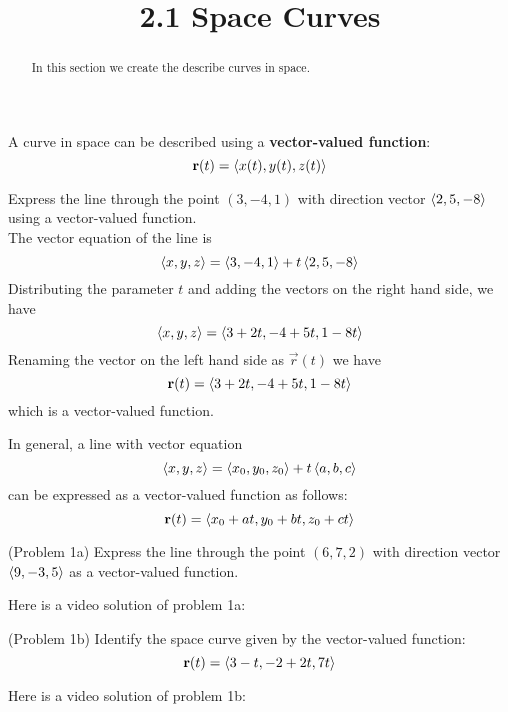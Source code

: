 \documentclass[handout]{ximera}
\title{2.1 Space Curves}
\begin{document}
\begin{abstract}
In this section we create the describe curves in space.
\end{abstract}

\maketitle


A curve in space can be described using a \textbf{vector-valued function}:
\[
\mathbf r(t) = \left\langle x(t), y(t), z(t)\right\rangle
\]

\begin{example}[Example 1]
Express the line through the point $(3, -4, 1)$ with direction vector $\left\langle 2, 5, -8\right\rangle$ using a vector-valued function.\\
The vector equation of the line is 
\[
\left\langle x, y, z\right\rangle = \left\langle 3, -4, 1\right\rangle + t\left\langle 2, 5, -8\right\rangle
\]
Distributing the parameter $t$ and adding the vectors on the right hand side, we have
\[
\left\langle x, y, z\right\rangle = \left\langle 3+2t,-4+ 5t, 1-8t\right\rangle
\]
Renaming the vector on the left hand side as $\vec r(t)$ we have
\[
\mathbf r(t) = \left\langle 3+2t,-4+ 5t, 1-8t\right\rangle
\]
which is a vector-valued function.

\end{example}

\begin{remark}

In general, a line with vector equation
\[
\left\langle x, y, z\right\rangle = \left\langle x_0, y_0, z_0\right\rangle + t\left\langle a, b, c\right\rangle
\]
can be expressed as a vector-valued function as follows:
\[
\mathbf r(t) = \left\langle x_0 + at, y_0 + bt, z_0 + ct\right\rangle
\]
\end{remark}

\begin{problem}(Problem 1a)
Express the line through the point $(6, 7, 2)$ with direction vector $\left\langle 9, -3, 5\right\rangle$ as a vector-valued function.
\end{problem}

Here is a video solution of problem 1a:\\
\begin{foldable}
\end{foldable}

\begin{problem}(Problem 1b)
Identify the space curve given by the vector-valued function:
\[
\mathbf r(t) = \left\langle 3 -t, -2 + 2t, 7t\right\rangle
\]
\end{problem}  
Here is a video solution of problem 1b:\\
\begin{foldable}
\end{foldable}
\end{document}
